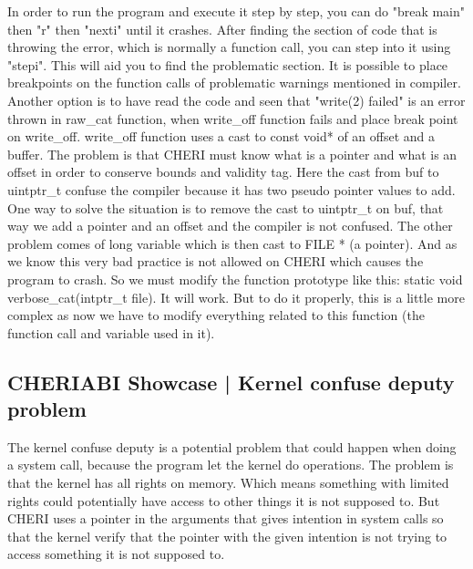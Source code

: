 \documentclass[a4paper, 11pt]{article}
\begin{document}
	
	 In order to run the program and execute it step by step, you can do "break main" then "r" then "nexti" until it crashes.
	 After finding the section of code that is throwing the error, which is normally a function call, you can step into it using "stepi". This will aid you to find the problematic section.
	 It is possible to place breakpoints on the function calls of problematic warnings mentioned in compiler.
	 Another option is to have read the code and seen that "write(2) failed" is an error thrown in raw\_cat function, when write\_off function fails and place break point on write\_off.
	 write\_off function uses a cast to const void* of an offset and a buffer. The problem is that CHERI must know what is a pointer and what is an offset in order to conserve bounds and validity tag. Here the cast from buf to uintptr\_t confuse the compiler because it has two pseudo pointer values to add.
	 One way to solve the situation is to remove the cast to uintptr\_t on buf, that way we add a pointer and an offset and the compiler is not confused.
	 The other problem comes of long variable which is then cast to FILE * (a pointer). And as we know this very bad practice is not allowed on CHERI which causes the program to crash.
	 So we must modify the function prototype like this: static void verbose\_cat(intptr\_t file). It will work. But to do it properly, this is a little more complex as now we have to modify everything related to this function (the function call and variable used in it).
		

	\subsection{CHERIABI Showcase | Kernel confuse deputy problem}

		The kernel confuse deputy is a potential problem that could happen when doing a system call, because the program let the kernel do operations. The problem is that the kernel has all rights on memory. Which means something with limited rights could potentially have access to other things it is not supposed to.
		But CHERI uses a pointer in the arguments that gives intention in system calls so that the kernel verify that the pointer with the given intention is not trying to access something it is not supposed to. 
\end{document}
